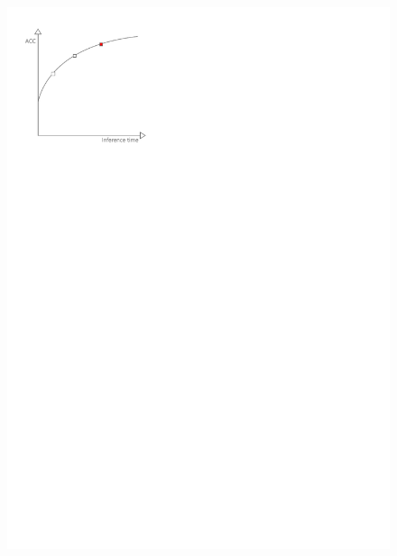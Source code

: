 \documentclass[aspectratio=169,xcolor=dvipsnames]{beamer}
\begin{document}
\begin{frame}
\begin{columns}[c]
\begin{figure}[htbp]
            \includegraphics[width=.8\textwidth]{pareto_front.pdf}
        \end{figure}
    \end{columns}
\end{frame}
\end{document}
